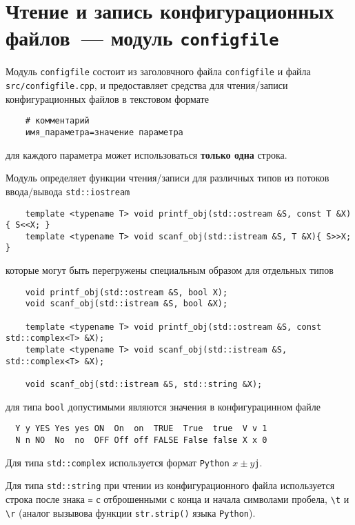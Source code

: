 \section{Чтение и запись конфигурационных файлов~--- модуль {\tt configfile}}\label{configfile:sec}
Модуль \verb'configfile' состоит из заголовчного файла \verb'configfile' и файла \verb'src/configfile.cpp',
и предоставляет средства для чтения/записи конфигурационных файлов в текстовом формате
\begin{verbatim}
    # комментарий
    имя_параметра=значение параметра
\end{verbatim}
для каждого параметра может использоваться {\bf только одна} строка. 

Модуль определяет функции чтения/записи для различных типов из потоков ввода/вывода \verb'std::iostream'
\begin{verbatim}
    template <typename T> void printf_obj(std::ostream &S, const T &X){ S<<X; }
    template <typename T> void scanf_obj(std::istream &S, T &X){ S>>X; }
\end{verbatim}
которые могут быть перегружены специальным образом для отдельных типов
\begin{verbatim}
    void printf_obj(std::ostream &S, bool X);
    void scanf_obj(std::istream &S, bool &X);

    template <typename T> void printf_obj(std::ostream &S, const std::complex<T> &X);
    template <typename T> void scanf_obj(std::istream &S, std::complex<T> &X);

    void scanf_obj(std::istream &S, std::string &X);
\end{verbatim}
для типа \verb'bool' допустимыми являются значения в конфигурацинном файле
\begin{verbatim}
  Y y YES Yes yes ON  On  on  TRUE  True  true  V v 1
  N n NO  No  no  OFF Off off FALSE False false X x 0
\end{verbatim}
Для типа \verb'std::complex' используется формат \verb'Python' $x\pm y$\verb'j'.

Для типа \verb'std::string' при чтении из конфигурационного файла используется строка после знака \verb'=' с отброшенными с конца и начала символами
пробела, \verb'\t' и \verb'\r' (аналог вызывова функции \verb'str.strip()' языка \verb'Python').

